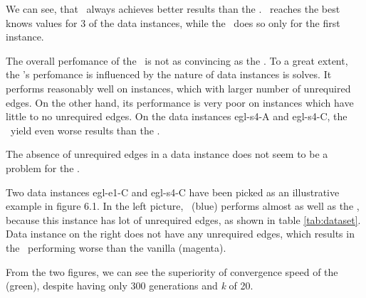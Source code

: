 \documentclass[twoside]{ctuthesis}
\theoremstyle{plain}
\theoremstyle{definition}
\theoremstyle{note}
\begin{document}
We can see, that \nnsredge\ always achieves better results than the \nnsrvanilla. \nnsredge\ reaches the best knows values for 3 of the data instances, while the \nnsrvanilla\ does so only for the first instance.


The overall perfomance of the \nnsrnode\ is not as convincing as the \nnsredge. To a great extent, the \nnsrnode's perfomance is influenced by the nature of data instances is solves. It performs reasonably well on instances, which with larger number of unrequired edges. On the other hand, its performance is very poor on instances which have little to no unrequired edges. On the data instances egl-s4-A and egl-s4-C, the \nnsrnode\ yield even worse results than the \nnsrvanilla.

The absence of unrequired edges in a data instance does not seem to be a problem for the \nnsredge.

Two data instances egl-e1-C and egl-s4-C have been picked as an illustrative example in figure 6.1. In the left picture, \nnsrnode\ (blue) performs almost as well as the \nnsredge, because this instance has lot of unrequired edges, as shown in table \ref{tab:dataset}. Data instance on the right does not have any unrequired edges, which results in the \nnsrnode\ performing worse than the vanilla (magenta). 

From the two figures, we can see the superiority of convergence speed of the \nnsredge (green), despite having only 300 generations and \emph{k} of 20.



\end{document}
